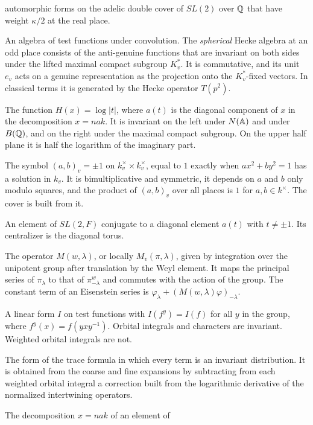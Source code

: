 \begin{description}
  automorphic forms on the adelic double cover of $SL(2)$ over $\mathbb{Q}$ that
  have weight $\kappa/2$ at the real place.
\item[Hecke algebra.] An algebra of test functions under convolution.
  The \emph{spherical} Hecke algebra at an odd place consists of the
  anti-genuine functions that are invariant on both sides under the
  lifted maximal compact subgroup $K_v^*$. It is commutative, and its
  unit $e_v$ acts on a genuine representation as the projection onto the
  $K_v^*$-fixed vectors. In classical terms it is generated by the Hecke
  operator $T(p^2)$.
\item[Height.] The function $H(x)=\log|t|$, where $a(t)$ is the diagonal
  component of $x$ in the decomposition $x=nak$. It is invariant on the
  left under $N(\mathbb{A})$ and under $B(\mathbb{Q})$, and on the right under the
  maximal compact subgroup. On the upper half plane it is half the
  logarithm of the imaginary part.
\item[Hilbert symbol.] The symbol $(a,b)_v=\pm1$ on $k_v^\times\times
  k_v^\times$, equal to $1$ exactly when $ax^2+by^2=1$ has a solution in
  $k_v$. It is bimultiplicative and symmetric, it depends on $a$ and $b$
  only modulo squares, and the product of $(a,b)_v$ over all places is
  $1$ for $a,b\in k^\times$. The cover is built from it.
\item[Hyperbolic element.] An element of $SL(2,F)$ conjugate to a
  diagonal element $a(t)$ with $t\ne\pm1$. Its centralizer is the
  diagonal torus.
\item[Intertwining operator.] The operator $M(w,\lambda)$, or locally
  $M_v(\pi,\lambda)$, given by integration over the unipotent group
  after translation by the Weyl element. It maps the principal series of
  $\pi_\lambda$ to that of $\pi^w_{-\lambda}$ and commutes with the action
  of the group. The constant term of an Eisenstein series is
  $\varphi_\lambda+(M(w,\lambda)\varphi)_{-\lambda}$.
\item[Invariant distribution.] A linear form $I$ on test functions with
  $I(f^y)=I(f)$ for all $y$ in the group, where $f^y(x)=f(yxy^{-1})$.
  Orbital integrals and characters are invariant. Weighted orbital
  integrals are not.
\item[Invariant trace formula.] The form of the trace formula in which
  every term is an invariant distribution. It is obtained from the
  coarse and fine expansions by subtracting from each weighted orbital
  integral a correction built from the logarithmic derivative of the
  normalized intertwining operators.
\item[Iwasawa decomposition.] The decomposition $x=nak$ of an element of

\end{description}
